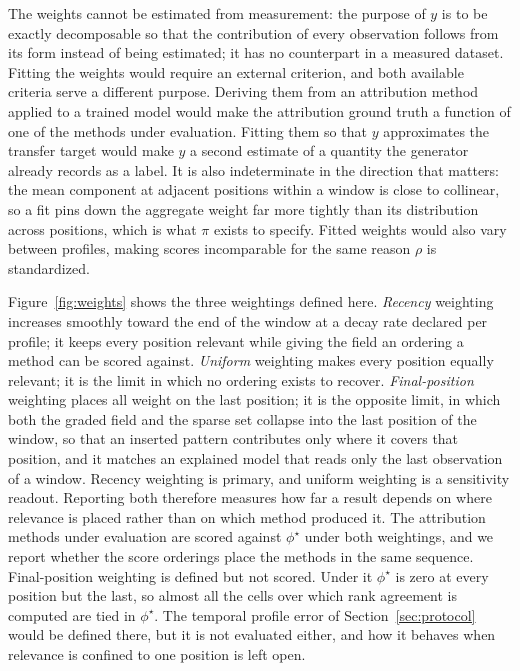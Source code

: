 \documentclass{article}
\newif\ifreview \reviewtrue        %
\newcommand{\rev}[1]{\ifreview\textcolor[HTML]{0B5FA5}{#1}\else#1\fi}
\newcommand{\revwhy}[1]{\ifreview\marginpar{\footnotesize\raggedright\textcolor[HTML]{0B5FA5}{#1}}\fi}
\newcommand{\revw}[1]{\ifreview\textcolor[HTML]{6FA8A0}{#1}\else#1\fi}   %
\begin{document}
\revw{The weights cannot} be estimated from measurement: the purpose of $y$ is to be exactly decomposable so that the contribution of every observation follows from its form instead of being estimated; it has no counterpart in a measured dataset. Fitting the weights would require an external criterion, and both available criteria serve a different purpose. Deriving them from an attribution method applied to a trained model would make the attribution ground truth a function of one of the methods under evaluation. Fitting them so that $y$ approximates the transfer target would make $y$ a second estimate of a quantity the generator already records as a label. It is also indeterminate in the direction that matters: the mean component at adjacent positions within a window is close to collinear, so a fit pins down the aggregate weight far more tightly than its distribution across positions, which is what \revw{$\pi$} exists to specify.\revwhy{C1: the weights are $w$ and $\pi$} Fitted weights would also vary between profiles, making scores incomparable for the same reason $\rho$ is standardized.

Figure~\ref{fig:weights} shows the three weightings \rev{defined here}. \emph{Recency} weighting increases smoothly toward the end of the window at a decay rate declared per profile; it keeps every position relevant while giving the field an ordering a method can be scored against. \emph{Uniform} weighting makes every position equally relevant; it is the limit in which no ordering exists to recover. \emph{Final-position} weighting places all weight on the last position; it is the opposite limit, in which \rev{both the graded field and the sparse set collapse into the last position of the window, so that an inserted pattern contributes only where it covers that position,} and it matches an explained model that reads only the last observation of a window. \rev{Recency weighting is primary, and uniform weighting is a sensitivity readout.} Reporting \rev{both} therefore measures how far a result depends on where relevance is placed rather than on which method produced it. The attribution methods under evaluation are scored against $\phi^{\star}$ under \rev{both} weightings, and we report whether the score orderings place the methods in the same sequence. \rev{Final-position weighting is defined but not scored. Under it $\phi^{\star}$ is zero at every position but the last, so almost all the cells over which rank agreement is computed are tied in $\phi^{\star}$. The temporal profile error of Section~\ref{sec:protocol} would be defined there, but it is not evaluated either, and how it behaves when relevance is confined to one position is left open.}\revwhy{X8: final position not scored (D25)}
\end{document}

